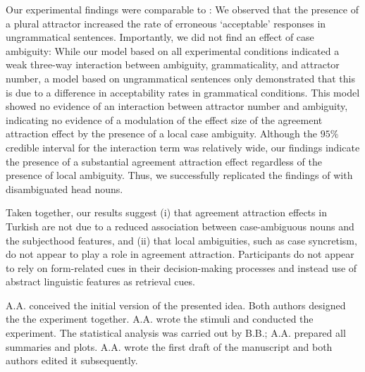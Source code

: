 \documentclass[apacite,linguex]{glossa}\usepackage[]{graphicx}\usepackage[]{color}
\newcommand{\firstauthor}{{A.A.}}
\newcommand{\secondauthor}{{B.B.}}
\begin{document}
Our experimental findings were comparable to \citet{LagoEtAl:2019}: We observed that the presence of a plural attractor increased the rate of erroneous `acceptable' responses  
in ungrammatical sentences.
Importantly, we did not find an effect of case ambiguity: While our model based on all experimental conditions indicated a weak three-way interaction between ambiguity, grammaticality, and attractor number, a model based on ungrammatical sentences only demonstrated that this is due to a difference in acceptability rates in grammatical conditions. This model showed no evidence of an interaction between attractor number and ambiguity, indicating no evidence of a modulation of the effect size of the agreement attraction effect by the presence of a local case ambiguity. 
Although the $95\%$ credible interval for the interaction term was relatively wide, our findings indicate the presence of a substantial agreement attraction effect regardless of the presence of local ambiguity.
Thus, we successfully replicated the findings of \citet{LagoEtAl:2019} with disambiguated head nouns. 

Taken together, our results suggest (i) that agreement attraction effects in Turkish are not due to a reduced association between case-ambiguous nouns and the subjecthood features, and (ii) that local ambiguities, such as case syncretism, do not appear to play a role in agreement attraction. Participants do not appear to rely on form-related cues in their decision-making processes and instead use of abstract linguistic features as retrieval cues.











{\firstauthor} conceived the initial version of the presented idea. Both authors designed the the experiment together. 
{\firstauthor} wrote the stimuli and conducted the experiment. The statistical analysis was carried out by {\secondauthor}; {\firstauthor} prepared all summaries and plots. {\firstauthor} wrote the first draft of the manuscript and both authors edited it subsequently. 




\end{document}
